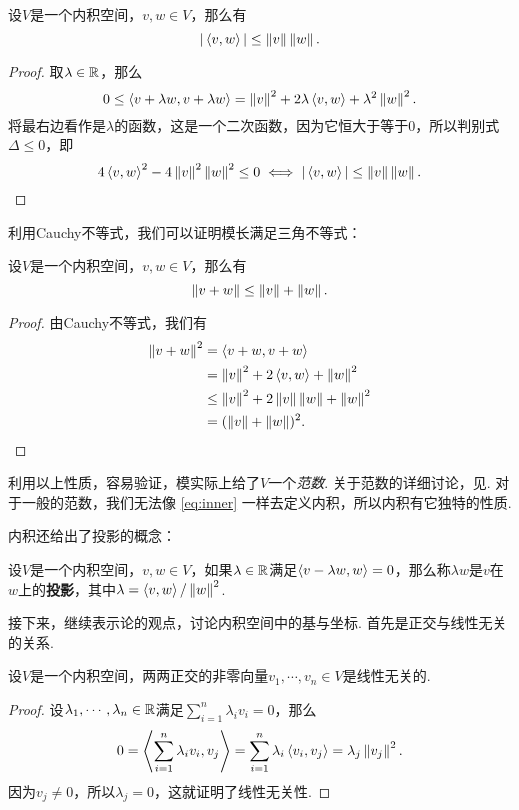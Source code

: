 \begin{theorem}[Cauchy不等式]\label{thm:cauchy}
设$V$是一个内积空间，$v,w\in V$，那么有
\[
    |\left\langle{v},{w}\right\rangle|\leq \left\|v\right\|\left\|w\right\|.
\]
\end{theorem}

\begin{proof}
    取$\lambda\in \mathbb{R}$，那么
    \[
        0\leq \left\langle{v+\lambda w},{v+\lambda w}\right\rangle=\left\|v\right\|^2+2\lambda\left\langle{v},{w}\right\rangle+\lambda^2\left\|w\right\|^2.
    \]
将最右边看作是$\lambda$的函数，这是一个二次函数，因为它恒大于等于$0$，所以判别式$\Delta\leq 0$，即
\[
    4\left\langle{v},{w}\right\rangle^2-4\left\|v\right\|^2\left\|w\right\|^2\leq 0\iff |\left\langle{v},{w}\right\rangle|\leq \left\|v\right\|\left\|w\right\|.
\]
\end{proof}

利用Cauchy不等式，我们可以证明模长满足三角不等式：
\begin{theorem}[三角不等式]\label{thm:triangle}
设$V$是一个内积空间，$v,w\in V$，那么有
\[
    \left\|v+w\right\|\leq \left\|v\right\|+\left\|w\right\|.
\]
\end{theorem}

\begin{proof}
由Cauchy不等式，我们有
\begin{align*}
    \left\|v+w\right\|^2 &= \left\langle{v+w},{v+w}\right\rangle \\
    &= \left\|v\right\|^2+2\left\langle{v},{w}\right\rangle+\left\|w\right\|^2 \\
    &\leq \left\|v\right\|^2+2\left\|v\right\|\left\|w\right\|+\left\|w\right\|^2 \\
    &= (\left\|v\right\|+\left\|w\right\|)^2.
\end{align*}
\end{proof}
利用以上性质，容易验证，模实际上给了$V$一个\emph{范数}. 关于范数的详细讨论，见. 对于一般的范数，我们无法像 \eqref{eq:inner} 一样去定义内积，所以内积有它独特的性质. 


内积还给出了投影的概念：

\begin{definition}[投影]
设$V$是一个内积空间，$v,w\in V$，如果$\lambda\in\mathbb{R}$满足$\left\langle{v-\lambda w},{w}\right\rangle=0$，那么称$\lambda w$是$v$在$w$上的\textbf{投影}，其中$\lambda=\left\langle{v},{w}\right\rangle/\left\|w\right\|^2$.
\end{definition}

接下来，继续表示论的观点，讨论内积空间中的基与坐标. 首先是正交与线性无关的关系. 

\begin{proposition}\label{prop:orthogonal}
设$V$是一个内积空间，两两正交的非零向量$v_1,\cdots,v_n\in V$是线性无关的. 
\end{proposition}
\begin{proof}
设$\lambda_1,\cdots,\lambda_n\in\mathbb{R}$满足$\sum_{i=1}^n\lambda_iv_i=0$，那么
\[
    0=\left\langle{\sum_{i=1}^n\lambda_iv_i},{v_j}\right\rangle=\sum_{i=1}^n\lambda_i\left\langle{v_i},{v_j}\right\rangle=\lambda_j\left\|v_j\right\|^2.
\]
因为$v_j\neq 0$，所以$\lambda_j=0$，这就证明了线性无关性. 
\end{proof}


